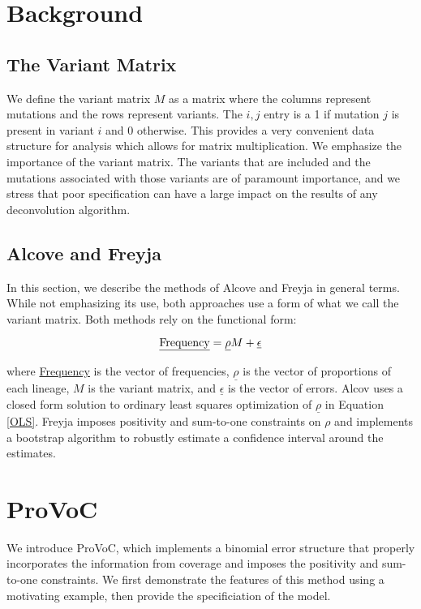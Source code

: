\documentclass{article}
\begin{document}
\section{Background}

\subsection{The Variant Matrix}

We define the variant matrix $M$ as a matrix where the columns represent mutations and the rows represent variants.
The $i,j$ entry is a 1 if mutation $j$ is present in variant $i$ and 0 otherwise.
This provides a very convenient data structure for analysis which allows for matrix multiplication.
We emphasize the importance of the variant matrix.
The variants that are included and the mutations associated with those variants are of paramount importance, and we stress that poor specification can have a large impact on the results of any deconvolution algorithm.

\subsection{Alcove and Freyja}

In this section, we describe the methods of Alcove and Freyja in general terms.
While not emphasizing its use, both approaches use a form of what we call the variant matrix. 
Both methods rely on the functional form:

\begin{equation}
\text{\underline{Frequency}} = \underline \rho M + \underline \epsilon \label{OLS}
\end{equation}

\noindent where \underline{Frequency} is the vector of frequencies, $\underline \rho$ is the vector of proportions of each lineage, $M$ is the variant matrix, and $\underline \epsilon$ is the vector of errors.
Alcov uses a closed form solution to ordinary least squares optimization of $\underline \rho$ in Equation \ref{OLS}.
Freyja imposes positivity and sum-to-one constraints on $\rho$ and implements a bootstrap algorithm to robustly estimate a confidence interval around the estimates.

\section{ProVoC}

We introduce ProVoC, which implements a binomial error structure that properly incorporates the information from coverage and imposes the positivity and sum-to-one constraints.
We first demonstrate the features of this method using a motivating example, then provide the specificiation of the model.
\end{document}
